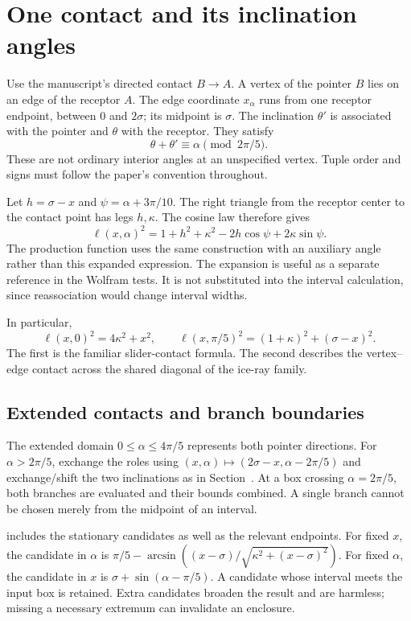 \documentclass[11pt,a4paper]{article}
\newcommand{\code}[1]{\texttt{\detokenize{#1}}}
\theoremstyle{remark}\newtheorem*{contract}{Implementation contract}\newtheorem*{auditnote}{Audit note}
\begin{document}
\section{One contact and its inclination angles}

Use the manuscript's directed contact $B\to A$. A vertex of the pointer $B$
lies on an edge of the receptor $A$. The edge coordinate $x_\alpha$ runs from
one receptor endpoint, between $0$ and $2\sigma$; its midpoint is $\sigma$.
The inclination $\theta'$ is associated with the pointer and $\theta$ with
the receptor. They satisfy
\[
\theta+\theta'\equiv\alpha\pmod{2\pi/5}.
\]
These are not ordinary interior angles at an unspecified vertex. Tuple order
and signs must follow the paper's convention throughout.

Let $h=\sigma-x$ and $\psi=\alpha+3\pi/10$. The right triangle from the
receptor center to the contact point has legs $h,\kappa$. The cosine law
therefore gives
\[
\ell(x,\alpha)^2
=1+h^2+\kappa^2-2h\cos\psi+2\kappa\sin\psi.
\]
The production function \code{ell_aux} uses the same construction with an
auxiliary angle rather than this expanded expression. The expansion is useful
as a separate reference in the Wolfram tests. It is not substituted into the
interval calculation, since reassociation would change interval widths.



In particular,
\[
\ell(x,0)^2=4\kappa^2+x^2,
\qquad
\ell(x,\pi/5)^2=(1+\kappa)^2+(\sigma-x)^2.
\]
The first is the familiar slider-contact formula. The second describes the
vertex--edge contact across the shared diagonal of the ice-ray family.

\subsection{Extended contacts and branch boundaries}
The extended domain $0\le\alpha\le4\pi/5$ represents both pointer
directions. For $\alpha>2\pi/5$, exchange the roles using
$(x,\alpha)\mapsto(2\sigma-x,\alpha-2\pi/5)$ and exchange/shift the two
inclinations as in Section~\PaperContactCoordinates. At a box crossing
$\alpha=2\pi/5$, both branches are evaluated and their bounds combined.
A single branch cannot be chosen merely from the midpoint of an interval.

\code{ellxmono_r} includes the stationary candidates as well as the relevant
endpoints. For fixed $x$, the candidate in $\alpha$ is
$\pi/5-\arcsin((x-\sigma)/\sqrt{\kappa^2+(x-\sigma)^2})$.
For fixed $\alpha$, the candidate in $x$ is
$\sigma+\sin(\alpha-\pi/5)$. A candidate whose interval meets the input
box is retained. Extra candidates broaden the result and are harmless;
missing a necessary extremum can invalidate an enclosure.
\end{document}
